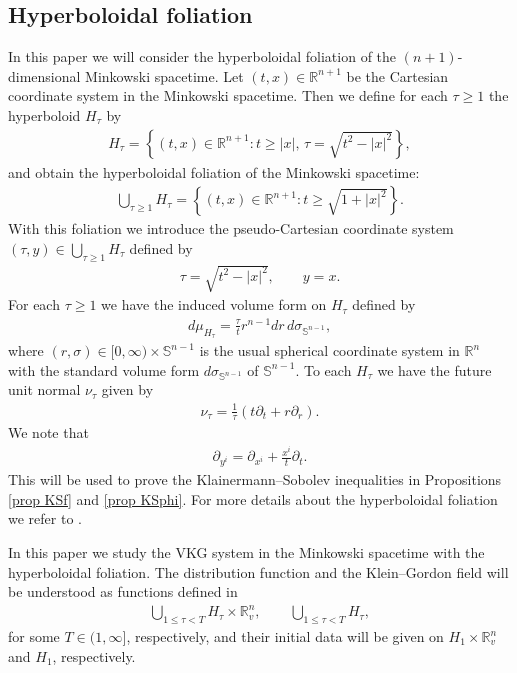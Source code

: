 \documentclass{article}
\newcommand{\bbr}{{\mathbb R}}
\newcommand{\bbs}{{\mathbb S}}
\begin{document}
\subsection{Hyperboloidal foliation} \label{sec hf}
In this paper we will consider the hyperboloidal foliation of the $ ( n + 1 ) $-dimensional Minkowski spacetime. Let $ ( t , x ) \in \bbr^{ n + 1 } $ be the Cartesian coordinate system in the Minkowski spacetime. Then we define for each $ \tau \geq 1 $ the hyperboloid $ H_\tau $ by
\begin{align*}
H_\tau = \left\{ ( t , x ) \in \bbr^{ n + 1 } : t \geq | x | , \, \tau = \sqrt{ t^2 - | x |^2 } \right\} ,
\end{align*}
and obtain the hyperboloidal foliation of the Minkowski spacetime:
\begin{align*}
\bigcup_{ \tau \geq 1 } H_\tau = \left\{ ( t , x ) \in \bbr^{ n + 1 } : t \geq \sqrt{ 1 + | x |^2 } \right\} .
\end{align*}
With this foliation we introduce the pseudo-Cartesian coordinate system $ ( \tau , y ) \in \bigcup_{ \tau \geq 1 } H_\tau $ defined by
\begin{align}
\tau = \sqrt{ t^2 - | x |^2 } , \qquad y = x . \label{tau}
\end{align}
For each $ \tau \geq 1 $ we have the induced volume form on $ H_\tau $ defined by
\begin{align}
d \mu_{ H_\tau } = \frac{ \tau }{ t } r^{ n - 1 } d r \, d \sigma_{ \bbs^{ n - 1 } } , \label{dmuH_tau}
\end{align}
where $ ( r , \sigma ) \in [ 0 , \infty ) \times \bbs^{ n - 1 } $ is the usual spherical coordinate system in $ \bbr^n $ with the standard volume form $ d \sigma_{ \bbs^{ n - 1 } } $ of $ \bbs^{ n - 1 } $. To each $ H_\tau $ we have the future unit normal $ \nu_\tau $ given by
\begin{align}
\nu_\tau = \frac{ 1 }{ \tau }( t \partial_t + r \partial_r ) . \label{nutau}
\end{align}
We note that
\begin{align}
\partial_{ y^i } = \partial_{ x^i } + \frac{ x^i }{ t } \partial_t . \label{partialy0}
\end{align}
This will be used to prove the Klainermann--Sobolev inequalities in Propositions \ref{prop KSf} and \ref{prop KSphi}. For more details about the hyperboloidal foliation we refer to \cite{FJS17, LM14}.

In this paper we study the VKG system in the Minkowski spacetime with the hyperboloidal foliation. The distribution function and the Klein--Gordon field will be understood as functions defined in
\begin{align*}
\bigcup_{ 1 \leq \tau < T } H_\tau \times \bbr^n_v , \qquad \bigcup_{ 1 \leq \tau < T } H_\tau ,
\end{align*}
for some $ T \in ( 1 , \infty ] $, respectively, and their initial data will be given on $ H_1 \times \bbr^n_v $ and $ H_1 $, respectively. 
\end{document}
